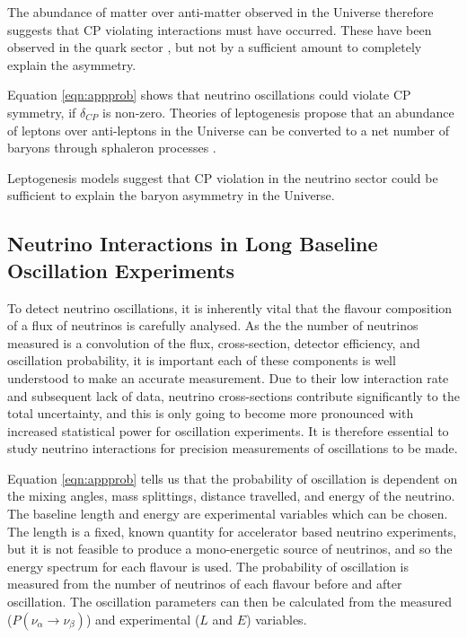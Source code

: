 The abundance of matter over anti-matter observed in the Universe therefore suggests that CP violating interactions must have occurred. These have been observed in the quark sector \cite{quarkcpv}, but not by a sufficient amount to completely explain the asymmetry. 

Equation \ref{eqn:appprob} shows that neutrino oscillations could violate CP symmetry, if $\delta_{CP}$ is non-zero. Theories of leptogenesis propose that an abundance of leptons over anti-leptons in the Universe can be converted to a net number of baryons through sphaleron processes \cite{sphaleron}. 

Leptogenesis models \cite{lepto1}\cite{lepto2} suggest that CP violation in the neutrino sector could be sufficient to explain the baryon asymmetry in the Universe.

\subsection{Neutrino Interactions in Long Baseline Oscillation Experiments}\label{sec:interactions}

To detect neutrino oscillations, it is inherently vital that the flavour composition of a flux of neutrinos is carefully analysed. As the the number of neutrinos measured is a convolution of the flux, cross-section, detector efficiency, and oscillation probability, it is important each of these components is well understood to make an accurate measurement. Due to their low interaction rate and subsequent lack of data, neutrino cross-sections contribute significantly to the total uncertainty, and this is only going to become more pronounced with increased statistical power for oscillation experiments. It is therefore essential to study neutrino interactions for precision measurements of oscillations to be made.

Equation \eqref{eqn:appprob} tells us that the probability of oscillation is dependent on the mixing angles, mass splittings, distance travelled, and energy of the neutrino. The baseline length and energy are experimental variables which can be chosen. The length is a fixed, known quantity for accelerator based neutrino experiments, but it is not feasible to produce a mono-energetic source of neutrinos, and so the energy spectrum for each flavour is used. The probability of oscillation is measured from the number of neutrinos of each flavour before and after oscillation. The oscillation parameters can then be calculated from the measured ($P(\nu_{\alpha}\rightarrow \nu_{\beta})$) and experimental ($L$ and $E$) variables.

